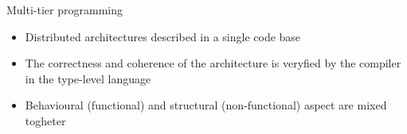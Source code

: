 \begin{frame}{Multi-tier programming}
  \begin{cardTiny}
    \begin{itemize}
      \item Distributed architectures  described in a single code base
      \item[\success{\faThumbsUp}] The correctness and coherence of the architecture is veryfied by the compiler in the type-level language 
      \item[\failure{\faThumbsDown}] Behavioural (functional) and structural (non-functional) aspect are mixed togheter 
    
    \end{itemize}
  \end{cardTiny}
  \centering
\end{frame}